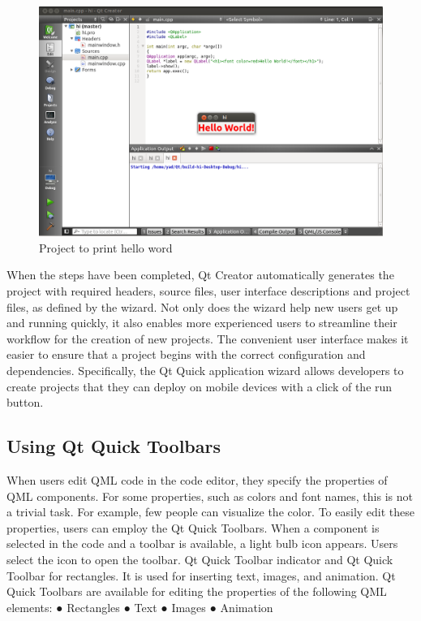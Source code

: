 \begin{figure}[h]
\begin{center}
\includegraphics[scale=0.4]{images/hi.png}
\caption{Project to print hello word}
\end{center}
\end{figure}

When  the  steps  have  been  completed,  Qt  Creator  automatically  generates  the  project  with  required
headers,  source  files,  user  interface  descriptions  and  project  files,  as  defined  by  the  wizard.  Not  only
does  the  wizard  help  new  users  get  up  and  running  quickly,  it  also  enables  more  experienced  users  to
streamline  their  workflow  for  the  creation  of new projects. The convenient user interface makes it easier
to  ensure  that  a  project  begins  with  the  correct  configuration  and  dependencies.  Specifically,  the  Qt
Quick  application  wizard  allows  developers  to  create  projects  that  they  can  deploy  on  mobile  devices
with a click of the run button.
\\


\subsection{Using Qt Quick Toolbars}


When  users  edit  QML  code  in  the  code  editor,  they  specify  the  properties  of  QML   components.  For
some  properties,  such  as  colors   and  font  names,  this  is  not  a  trivial  task.  For  example,  few  people  can
visualize the color.
To  easily  edit these properties, users can employ the Qt Quick Toolbars. When a component is selected
in  the  code  and  a  toolbar  is  available,  a  light  bulb  icon  appears.  Users  select  the  icon  to  open  the
toolbar.
Qt  Quick  Toolbar  indicator  and  Qt  Quick  Toolbar  for  rectangles.  It  is  used  for  inserting  text,  images,
and  animation.  Qt  Quick  Toolbars  are  available  for  editing  the  properties  of  the  following  QML
elements:
● Rectangles
● Text
● Images
● Animation


